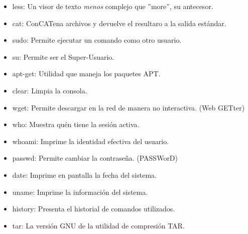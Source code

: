 \begin{itemize}
				\item less: \newline
				Un visor de texto \textit{menos} complejo que ''more'', su antecesor.
				
				\item cat: \newline
				ConCATena archivos y devuelve el resultaro a la salida estándar.
				
				\item sudo: \newline
				Permite ejecutar un comando como otro usuario.
				
				\item su: \newline
				Permite ser el Super-Usuario.
				
				\item apt-get: \newline
				Utilidad que maneja los paquetes APT.
				
				\item clear: \newline
				Limpia la consola.
				
				\item wget: \newline
				Permite descargar en la red de manera no interactiva. (Web GETter)
				
				\item who: \newline
				Muestra quén tiene la sesión activa.
				
				\item whoami: \newline
				Imprime la identidad efectiva del usuario.
				
				\item passwd: \newline
				Permite cambiar la contraseña. (PASSWorD)
				
				\item date:\newline
				Imprime en pantalla la fecha del sistema.
				
				\item uname: \newline
				Imprime la información del sistema.
				
				\item history: \newline
				Presenta el historial de comandos utilizados.
				
				\item tar: \newline
				La versión GNU de la utilidad de compresión TAR.
				

\end{itemize}
